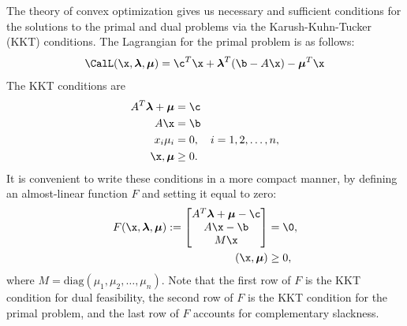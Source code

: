 The theory of convex optimization gives us necessary and sufficient conditions for the solutions to the primal and dual problems via the Karush-Kuhn-Tucker (KKT) conditions.
The Lagrangian for the primal problem is as follows:
\[
\CalL(\x, \Lamb, \Mu)
= \c^T\x + \Lamb^T(\b - A\x) - \Mu^T\x
\]
The KKT conditions are
\begin{align*}
A^T\Lamb + \Mu &= \c\\
A\x &= \b\\
x_i\mu_i &= 0, \quad i = 1,2,\ldots,n,\\
\x, \Mu &\geq 0.
\end{align*}
It is convenient to write these conditions in a more compact manner, by defining an almost-linear function $F$ and setting it equal to zero:
\begin{align*}
F(\x,\Lamb,\Mu) :=
\begin{bmatrix}
A^T\Lamb + \Mu - \c\\
A\x - \b\\
M\x\\
\end{bmatrix}
&= \0,\\
(\x,\Mu) &\geq 0,
\end{align*}
where $M = \text{diag}(\mu_1,\mu_2,\ldots,\mu_n)$.
Note that the first row of $F$ is the KKT condition for dual feasibility, the second row of $F$ is the KKT condition for the primal problem, and the last row of $F$ accounts for complementary slackness.

